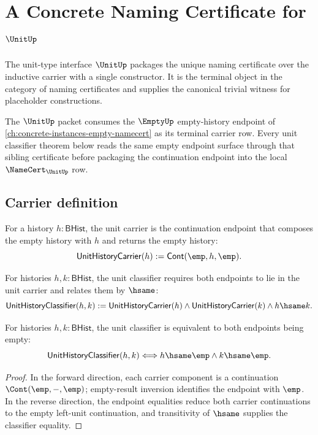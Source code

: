\chapter{A Concrete Naming Certificate for $\UnitUp$}
\label{ch:concrete-instances-unit-namecert}

The unit-type interface $\UnitUp$ packages the unique naming certificate over the inductive carrier with a single constructor. It is the terminal object in the category of naming certificates and supplies the canonical trivial witness for placeholder constructions.

The $\UnitUp$ packet consumes the $\EmptyUp$ empty-history endpoint of \autoref{ch:concrete-instances-empty-namecert} as its terminal carrier row. Every unit classifier theorem below reads the same empty endpoint surface through that sibling certificate before packaging the continuation endpoint into the local $\NameCert_{\UnitUp}$ row.

\section{Carrier definition}
\label{sec:unit-carrier}

\begin{definition}
\label{def:unit-history-carrier}
For a history $h:\mathsf{BHist}$, the unit carrier is the continuation
endpoint that composes the empty history with $h$ and returns the empty
history:
$$
\mathsf{UnitHistoryCarrier}(h):=\mathsf{Cont}(\emp,h,\emp).
$$
\end{definition}

\begin{definition}
\label{def:unit-history-classifier}
For histories $h,k:\mathsf{BHist}$, the unit classifier requires both
endpoints to lie in the unit carrier and relates them by $\hsame$:
$$
\mathsf{UnitHistoryClassifier}(h,k):=
\mathsf{UnitHistoryCarrier}(h)\land
\mathsf{UnitHistoryCarrier}(k)\land
h\hsame k.
$$
\end{definition}

\begin{theorem}
\label{thm:unit-history-classifier-empty-endpoints-iff}
For histories \(h,k:\mathsf{BHist}\), the unit classifier is equivalent to
both endpoints being empty:
$$
\mathsf{UnitHistoryClassifier}(h,k)
\Longleftrightarrow h\hsame\emp\land k\hsame\emp.
$$
\end{theorem}
\begin{proof}
In the forward direction, each carrier component is a continuation
\(\Cont(\emp,-,\emp)\); empty-result inversion identifies the endpoint with
\(\emp\). In the reverse direction, the endpoint equalities reduce both carrier
continuations to the empty left-unit continuation, and transitivity of
\(\hsame\) supplies the classifier equality.
\end{proof}

